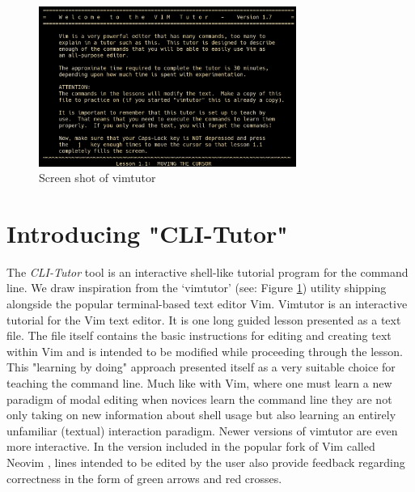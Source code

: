 \begin{figure}[htbp]
	\centering
	\includegraphics[width=0.75\textwidth]{img/vimtutor}
	\caption{Screen shot of vimtutor}
	\label{fig:vimtutor}
\end{figure}

\section{Introducing "CLI-Tutor"}

The \textit{CLI-Tutor} tool is an interactive shell-like tutorial program for
the command line. We draw inspiration from the
`vimtutor'\cite{pierce_ware_smith_moolenaar_2019} (see: Figure
\ref{fig:vimtutor}) utility shipping alongside the popular terminal-based text
editor Vim. Vimtutor is an interactive tutorial for the Vim text editor. It is
one long guided lesson presented as a text file. The file itself contains the
basic instructions for editing and creating text within Vim and is intended to
be modified while proceeding through the lesson. This "learning by doing"
approach presented itself as a very suitable choice for teaching the command
line. Much like with Vim, where one must learn a new paradigm of modal editing
when novices learn the command line they are not only taking on new information
about shell usage but also learning an entirely unfamiliar (textual)
interaction paradigm. Newer versions of vimtutor are even more interactive. In
the version included in the popular fork of Vim called Neovim
\cite{neovimHomeNeovim}, lines intended to be edited by the user also provide
feedback regarding correctness in the form of green arrows and red crosses.

